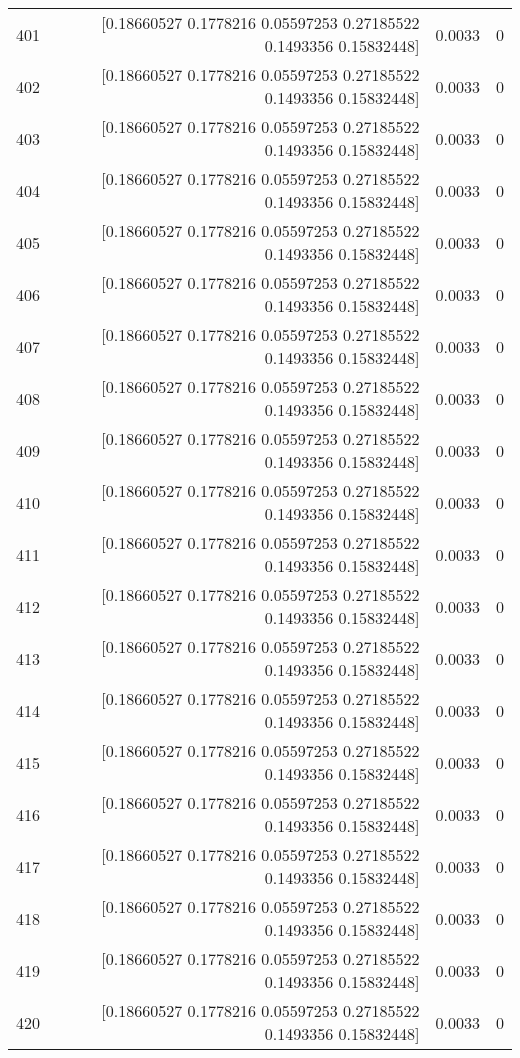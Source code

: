 \begin{longtable}{lrrr}
401 & [0.18660527 0.1778216  0.05597253 0.27185522 0.1493356  0.15832448] & 0.0033 & 0 \\
402 & [0.18660527 0.1778216  0.05597253 0.27185522 0.1493356  0.15832448] & 0.0033 & 0 \\
403 & [0.18660527 0.1778216  0.05597253 0.27185522 0.1493356  0.15832448] & 0.0033 & 0 \\
404 & [0.18660527 0.1778216  0.05597253 0.27185522 0.1493356  0.15832448] & 0.0033 & 0 \\
405 & [0.18660527 0.1778216  0.05597253 0.27185522 0.1493356  0.15832448] & 0.0033 & 0 \\
406 & [0.18660527 0.1778216  0.05597253 0.27185522 0.1493356  0.15832448] & 0.0033 & 0 \\
407 & [0.18660527 0.1778216  0.05597253 0.27185522 0.1493356  0.15832448] & 0.0033 & 0 \\
408 & [0.18660527 0.1778216  0.05597253 0.27185522 0.1493356  0.15832448] & 0.0033 & 0 \\
409 & [0.18660527 0.1778216  0.05597253 0.27185522 0.1493356  0.15832448] & 0.0033 & 0 \\
410 & [0.18660527 0.1778216  0.05597253 0.27185522 0.1493356  0.15832448] & 0.0033 & 0 \\
411 & [0.18660527 0.1778216  0.05597253 0.27185522 0.1493356  0.15832448] & 0.0033 & 0 \\
412 & [0.18660527 0.1778216  0.05597253 0.27185522 0.1493356  0.15832448] & 0.0033 & 0 \\
413 & [0.18660527 0.1778216  0.05597253 0.27185522 0.1493356  0.15832448] & 0.0033 & 0 \\
414 & [0.18660527 0.1778216  0.05597253 0.27185522 0.1493356  0.15832448] & 0.0033 & 0 \\
415 & [0.18660527 0.1778216  0.05597253 0.27185522 0.1493356  0.15832448] & 0.0033 & 0 \\
416 & [0.18660527 0.1778216  0.05597253 0.27185522 0.1493356  0.15832448] & 0.0033 & 0 \\
417 & [0.18660527 0.1778216  0.05597253 0.27185522 0.1493356  0.15832448] & 0.0033 & 0 \\
418 & [0.18660527 0.1778216  0.05597253 0.27185522 0.1493356  0.15832448] & 0.0033 & 0 \\
419 & [0.18660527 0.1778216  0.05597253 0.27185522 0.1493356  0.15832448] & 0.0033 & 0 \\
420 & [0.18660527 0.1778216  0.05597253 0.27185522 0.1493356  0.15832448] & 0.0033 & 0 \\

\end{longtable}
